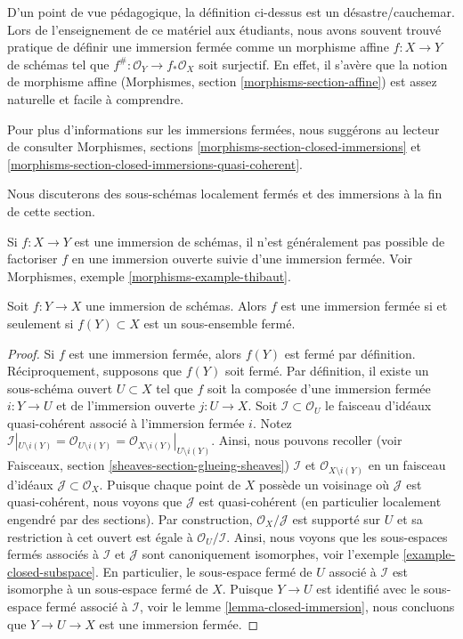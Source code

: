 \medskip\noindent
D'un point de vue pédagogique, la définition ci-dessus est un désastre/cauchemar.
Lors de l'enseignement de ce matériel aux étudiants, nous
avons souvent trouvé pratique de définir une immersion fermée comme
un morphisme affine $f : X \to Y$ de schémas tel que $f^\# : \mathcal{O}_Y \to
f_*\mathcal{O}_X$ soit surjectif. En effet, il s’avère que la notion de
morphisme affine (Morphismes, section \ref{morphisms-section-affine})
est assez naturelle et facile à comprendre.

\medskip\noindent
Pour plus d'informations sur les immersions fermées, nous suggérons au lecteur
de consulter Morphismes, sections \ref{morphisms-section-closed-immersions}
et \ref{morphisms-section-closed-immersions-quasi-coherent}.

\medskip\noindent
Nous discuterons des sous-schémas localement fermés et des immersions
à la fin de cette section.

\begin{remark}
\label{remark-not-reverse-open-closed}
Si $f : X \to Y$ est une immersion de schémas, il n'est généralement pas
possible de factoriser $f$ en une immersion ouverte suivie
d'une immersion fermée. Voir Morphismes, exemple \ref{morphisms-example-thibaut}.
\end{remark}

\begin{lemma}
\label{lemma-immersion-when-closed}
Soit $f : Y \to X$ une immersion de schémas. Alors $f$ est une immersion
fermée si et seulement si $f(Y) \subset X$ est un sous-ensemble fermé.
\end{lemma}

\begin{proof}
Si $f$ est une immersion fermée, alors $f(Y)$ est fermé par définition.
Réciproquement, supposons que $f(Y)$ soit fermé. Par
définition, il existe un sous-schéma ouvert $U \subset X$ tel que $f$ soit la composée
d'une immersion fermée $i : Y \to U$ et de l'immersion ouverte
$j : U \to X$. Soit $\mathcal{I} \subset \mathcal{O}_U$ le
faisceau d'idéaux quasi-cohérent associé à l'immersion fermée $i$. Notez
$\mathcal{I}|_{U
\setminus i(Y)} = \mathcal{O}_{U
\setminus i(Y)} = \mathcal{O}_{X
\setminus i(Y)}|_{U \setminus i(Y)}$. Ainsi, nous pouvons
recoller (voir Faisceaux, section \ref{sheaves-section-glueing-sheaves}) $\mathcal{I}$
et $\mathcal{O}_{X \setminus i(Y)}$ en un faisceau d'idéaux
$\mathcal{J} \subset \mathcal{O}_X$. Puisque chaque point de
$X$ possède un voisinage où $\mathcal{J}$ est quasi-cohérent,
nous voyons que $\mathcal{J}$ est quasi-cohérent (en particulier
localement engendré par des sections). Par
construction, $\mathcal{O}_X/\mathcal{J}$ est supporté sur $U$
et sa restriction à cet ouvert est égale à $\mathcal{O}_U/\mathcal{I}$.
Ainsi, nous voyons que les sous-espaces fermés associés à $\mathcal{I}$
et $\mathcal{J}$ sont canoniquement isomorphes,
voir l'exemple \ref{example-closed-subspace}.
En particulier, le sous-espace fermé de $U$ associé à $\mathcal{I}$
est isomorphe à un sous-espace fermé de $X$.
Puisque $Y \to U$ est identifié avec le sous-espace fermé
associé à $\mathcal{I}$, voir le lemme \ref{lemma-closed-immersion}, nous
concluons que $Y \to U \to X$ est
une immersion fermée.
\end{proof}

